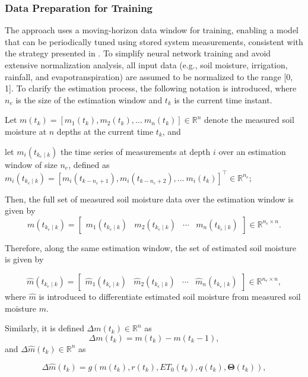 \documentclass[pdflatex,sn-nature]{sn-jnl}%
\theoremstyle{thmstyleone}%
\theoremstyle{thmstyletwo}%
\theoremstyle{thmstylethree}%
\begin{document}
\subsubsection{Data Preparation for Training}

The approach uses a moving-horizon data window for training, enabling a model that can be periodically tuned using stored system measurements, consistent with the strategy presented in \cite{condeforecast2024}. To simplify neural network training and avoid extensive normalization analysis, all input data (e.g., soil moisture, irrigation, rainfall, and evapotranspiration) are assumed to be normalized to the range [0, 1]. To clarify the estimation process, the following notation is introduced, where \( n_e \) is the size of the estimation window and \( t_k \) is the current time instant.

Let \( m(t_k) = [m_1(t_k), m_2(t_k), \dots\ m_n(t_k)] \in \mathbb{R}^{n} \) denote the measured soil moisture at $n$ depths at the current time \( t_k \), and 

let \( m_i(t_{k_e \mid k}) \) the time series of measurements at depth \( i \) over an estimation window of size $n_e$, defined as  
${m_i(t_{k_e \mid k})}=\left[m_i(t_{k-n_e +1}), m_i(t_{k-n_e +2}), ...\ m_i(t_{k}) \right]^\top \in \mathbb{R}^{n_e}$;


Then, the full set of measured soil moisture data over the estimation window is given by 
\[
m(t_{k_e \mid k}) = \begin{bmatrix}
m_1(t_{k_e \mid k}) & m_2(t_{k_e \mid k}) & \cdots & m_n(t_{k_e \mid k})
\end{bmatrix} \in \mathbb{R}^{n_e \times n}. 
\] 

Therefore, along the same estimation window, the set of estimated soil moisture is given by  

\[
\hat{m}(t_{k_e \mid k}) = \begin{bmatrix}
\hat{m}_1(t_{k_e \mid k}) & \hat{m}_2(t_{k_e \mid k}) & \cdots & \hat{m}_n(t_{k_e \mid k})
\end{bmatrix} \in \mathbb{R}^{n_e \times n}, 
\] 
where $\hat{m}$ is introduced to differentiate estimated soil moisture from measured soil moisture $m$. 

Similarly, it is defined $\Delta m(t_k) \in \mathbb{R}^{n}$ as 
\[
\Delta m(t_k) = m(t_k)-m(t_k-1),
\]
and $\Delta \hat{m}(t_k) \in \mathbb{R}^{n} $ as 

\[
\Delta \hat{m}(t_k) = g(m(t_k),r(t_k),ET_0 (t_k),q(t_k),\boldsymbol{\Theta}(t_k)),
\]
\end{document}
